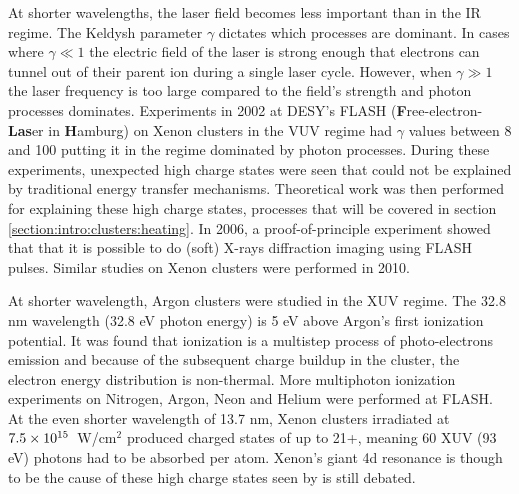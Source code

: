 At shorter wavelengths, the laser field becomes less important than in the IR
regime. The Keldysh parameter $\gamma$ dictates which processes are dominant. In
cases where $\gamma \ll 1$ the electric field of the laser is strong enough that
electrons can tunnel out of their parent ion during a single laser cycle.
However, when $\gamma \gg 1$ the laser frequency is too large compared to the
field's strength and photon processes dominates. Experiments in 2002\cite{Wabnitz2002} at
DESY's FLASH (\textbf{F}ree-electron-\textbf{Las}er in \textbf{H}amburg)\cite{Bostedt2009}
on Xenon clusters in the VUV regime had $\gamma$ values between 8 and
100 putting it in the regime dominated by photon processes.
During these experiments, unexpected high charge states were seen that could not
be explained by traditional energy transfer mechanisms. Theoretical work was
then performed for explaining these high charge states, processes that will be
covered in section \ref{section:intro:clusters:heating}.
In 2006, a proof-of-principle experiment showed that that it is possible to
do (soft) X-rays diffraction imaging using FLASH pulses\cite{Chapman2006}.
Similar studies on Xenon clusters were performed in 2010\cite{Bostedt2010}.

At shorter wavelength,
Argon clusters were studied in the XUV regime\cite{Bostedt2008}. The 32.8 nm
wavelength (32.8 eV photon energy) is 5 eV above Argon's first ionization
potential. It was found that ionization is a multistep process of
photo-electrons emission and because of the subsequent charge buildup in the
cluster, the electron energy distribution is non-thermal. More multiphoton
ionization experiments on Nitrogen, Argon, Neon and Helium were performed at
FLASH.
At the even shorter wavelength of 13.7 nm, Xenon clusters irradiated at
$\ten{7.5}{15}$~W/cm$^2$ produced charged states of up to 21+\cite{Sorokin2007,Richter2009},
meaning 60 XUV (93 eV) photons had to be absorbed per atom. Xenon's giant 4d
resonance is though to be the cause of these high charge states seen by is still
debated.

